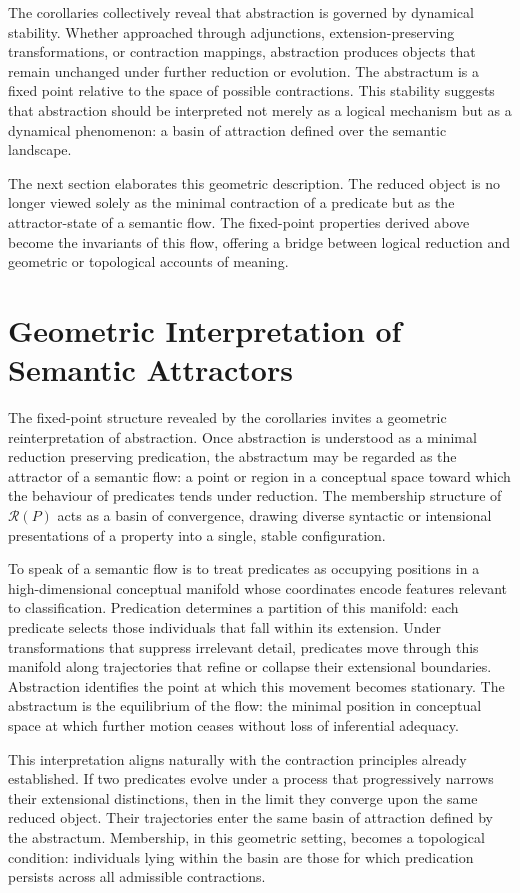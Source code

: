 \documentclass[12pt,letterpaper]{article}
\begin{document}
The corollaries collectively reveal that abstraction is governed by dynamical stability. Whether approached through adjunctions, extension-preserving transformations, or contraction mappings, abstraction produces objects that remain unchanged under further reduction or evolution. The abstractum is a fixed point relative to the space of possible contractions. This stability suggests that abstraction should be interpreted not merely as a logical mechanism but as a dynamical phenomenon: a basin of attraction defined over the semantic landscape.

The next section elaborates this geometric description. The reduced object is no longer viewed solely as the minimal contraction of a predicate but as the attractor-state of a semantic flow. The fixed-point properties derived above become the invariants of this flow, offering a bridge between logical reduction and geometric or topological accounts of meaning.

\section{Geometric Interpretation of Semantic Attractors}

The fixed-point structure revealed by the corollaries invites a geometric reinterpretation of abstraction. Once abstraction is understood as a minimal reduction preserving predication, the abstractum may be regarded as the attractor of a semantic flow: a point or region in a conceptual space toward which the behaviour of predicates tends under reduction. The membership structure of $\mathcal{R}(P)$ acts as a basin of convergence, drawing diverse syntactic or intensional presentations of a property into a single, stable configuration.

To speak of a semantic flow is to treat predicates as occupying positions in a high-dimensional conceptual manifold whose coordinates encode features relevant to classification. Predication determines a partition of this manifold: each predicate selects those individuals that fall within its extension. Under transformations that suppress irrelevant detail, predicates move through this manifold along trajectories that refine or collapse their extensional boundaries. Abstraction identifies the point at which this movement becomes stationary. The abstractum is the equilibrium of the flow: the minimal position in conceptual space at which further motion ceases without loss of inferential adequacy.

This interpretation aligns naturally with the contraction principles already established. If two predicates evolve under a process that progressively narrows their extensional distinctions, then in the limit they converge upon the same reduced object. Their trajectories enter the same basin of attraction defined by the abstractum. Membership, in this geometric setting, becomes a topological condition: individuals lying within the basin are those for which predication persists across all admissible contractions.
\end{document}
